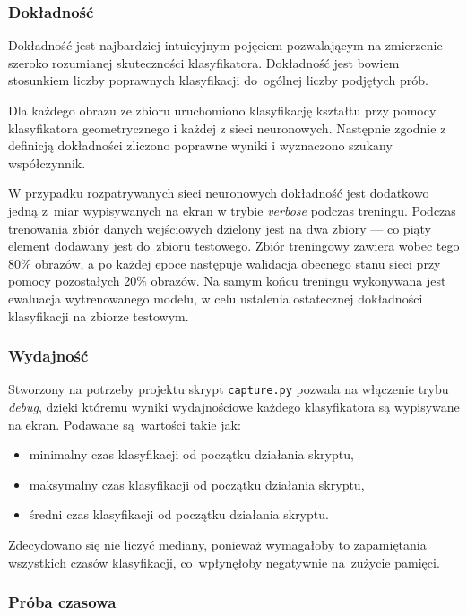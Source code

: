 \documentclass[11pt,a4paper]{article}
\begin{document}
\subsubsection{Dokładność}

Dokładność jest najbardziej intuicyjnym pojęciem pozwalającym na zmierzenie szeroko rozumianej skuteczności klasyfikatora. Dokładność jest bowiem stosunkiem liczby poprawnych klasyfikacji do~ogólnej liczby podjętych prób.

Dla każdego obrazu ze zbioru \cite{shapes} uruchomiono klasyfikację kształtu przy pomocy klasyfikatora geometrycznego i każdej z sieci neuronowych. Następnie zgodnie z definicją dokładności zliczono poprawne wyniki i wyznaczono szukany współczynnik.

W przypadku rozpatrywanych sieci neuronowych dokładność jest dodatkowo jedną z~miar wypisywanych na ekran w trybie \emph{verbose} podczas treningu. Podczas trenowania zbiór danych wejściowych dzielony jest na dwa zbiory --- co piąty element dodawany jest do~zbioru testowego. Zbiór treningowy zawiera wobec tego 80\% obrazów, a po każdej epoce następuje walidacja obecnego stanu sieci przy pomocy pozostałych 20\% obrazów. Na samym końcu treningu wykonywana jest ewaluacja wytrenowanego modelu, w celu ustalenia ostatecznej dokładności klasyfikacji na zbiorze testowym.

\subsubsection{Wydajność}

Stworzony na potrzeby projektu skrypt \verb+capture.py+ pozwala na włączenie trybu \emph{debug}, dzięki któremu wyniki wydajnościowe każdego klasyfikatora są wypisywane na ekran. Podawane są~wartości takie jak:
\begin{itemize}
    \item minimalny czas klasyfikacji od początku działania skryptu,
    \item maksymalny czas klasyfikacji od początku działania skryptu,
    \item średni czas klasyfikacji od początku działania skryptu.
\end{itemize}
Zdecydowano się nie liczyć mediany, ponieważ wymagałoby to zapamiętania wszystkich czasów klasyfikacji, co~wpłynęłoby negatywnie na~zużycie pamięci.

\subsubsection{Próba czasowa}
\end{document}
